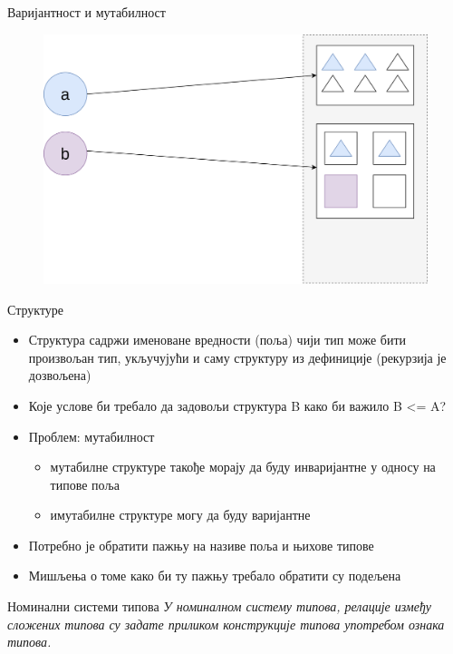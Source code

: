 \documentclass[xcolor=table]{beamer}
\begin{document}
\begin{frame}[allowframebreaks]{Варијантност и мутабилност}
        \begin{figure}
            \centering
            \includegraphics[height=0.7\textheight,keepaspectratio]{images/arr21.png}
        \end{figure}
    \end{frame}

    \begin{frame}{Структуре}
        \begin{itemize}
            \item Структура садржи именоване вредности (поља) чији тип може бити произвољан тип, укључујући и саму структуру из дефиниције (рекурзија је дозвољена)
            \item Које услове би требало да задовољи структура B како би важило B <= A?
            \item Проблем: мутабилност
            \begin{itemize}
                \item мутабилне структуре такође морају да буду инваријантне у односу на типове поља
                \item имутабилне структуре могу да буду варијантне
            \end{itemize}
            \item Потребно је обратити пажњу на називе поља и њихове типове
            \item Мишљења о томе како би ту пажњу требало обратити су подељена
        \end{itemize}
    \end{frame}

    \begin{frame}{Номинални системи типова}
        \textit{У номиналном систему типова, релације између сложених типова су задате приликом конструкције типова употребом ознака типова.}
    \end{frame}
\end{document}
